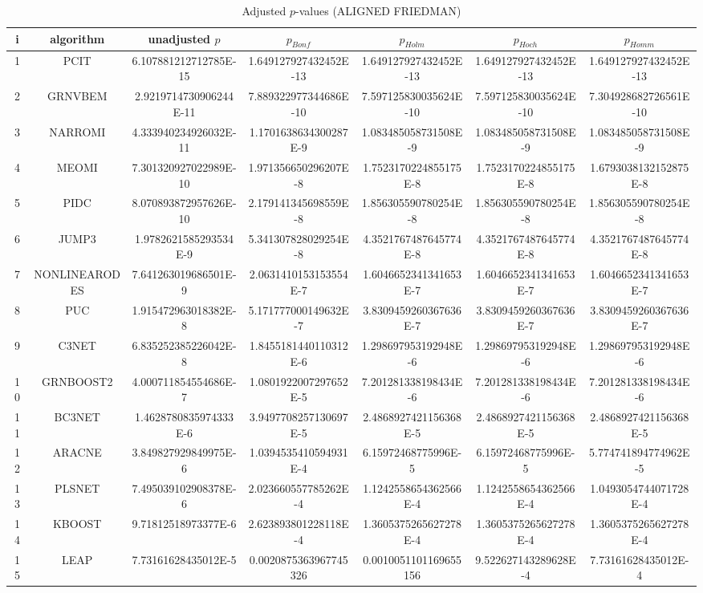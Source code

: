 \documentclass[a4paper,10pt]{article}
\begin{document}
\begin{landscape}
\begin{table}[!htp]
\centering\scriptsize
\caption{Adjusted $p$-values (ALIGNED FRIEDMAN)}
\begin{tabular}{ccccccc}
i&algorithm&unadjusted $p$&$p_{Bonf}$&$p_{Holm}$&$p_{Hoch}$&$p_{Homm}$\\
\hline
1&PCIT&6.107881212712785E-15&1.649127927432452E-13&1.649127927432452E-13&1.649127927432452E-13&1.649127927432452E-13\\
2&GRNVBEM&2.9219714730906244E-11&7.889322977344686E-10&7.597125830035624E-10&7.597125830035624E-10&7.304928682726561E-10\\
3&NARROMI&4.333940234926032E-11&1.1701638634300287E-9&1.083485058731508E-9&1.083485058731508E-9&1.083485058731508E-9\\
4&MEOMI&7.301320927022989E-10&1.971356650296207E-8&1.7523170224855175E-8&1.7523170224855175E-8&1.6793038132152875E-8\\
5&PIDC&8.070893872957626E-10&2.179141345698559E-8&1.856305590780254E-8&1.856305590780254E-8&1.856305590780254E-8\\
6&JUMP3&1.9782621585293534E-9&5.341307828029254E-8&4.3521767487645774E-8&4.3521767487645774E-8&4.3521767487645774E-8\\
7&NONLINEARODES&7.641263019686501E-9&2.0631410153153554E-7&1.6046652341341653E-7&1.6046652341341653E-7&1.6046652341341653E-7\\
8&PUC&1.915472963018382E-8&5.171777000149632E-7&3.8309459260367636E-7&3.8309459260367636E-7&3.8309459260367636E-7\\
9&C3NET&6.835252385226042E-8&1.8455181440110312E-6&1.298697953192948E-6&1.298697953192948E-6&1.298697953192948E-6\\
10&GRNBOOST2&4.000711854554686E-7&1.0801922007297652E-5&7.201281338198434E-6&7.201281338198434E-6&7.201281338198434E-6\\
11&BC3NET&1.4628780835974333E-6&3.9497708257130697E-5&2.4868927421156368E-5&2.4868927421156368E-5&2.4868927421156368E-5\\
12&ARACNE&3.849827929849975E-6&1.0394535410594931E-4&6.15972468775996E-5&6.15972468775996E-5&5.774741894774962E-5\\
13&PLSNET&7.495039102908378E-6&2.023660557785262E-4&1.1242558654362566E-4&1.1242558654362566E-4&1.0493054744071728E-4\\
14&KBOOST&9.71812518973377E-6&2.623893801228118E-4&1.3605375265627278E-4&1.3605375265627278E-4&1.3605375265627278E-4\\
15&LEAP&7.73161628435012E-5&0.0020875363967745326&0.0010051101169655156&9.522627143289628E-4&7.73161628435012E-4\\

\end{tabular}
\end{table}
\end{landscape}
\end{document}
